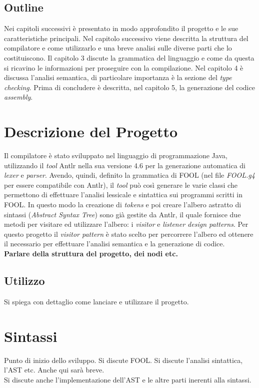 \documentclass{scrreprt}
\begin{document}
\section{Outline}
Nei capitoli successivi è presentato in modo approfondito il progetto e le sue caratteristiche principali. Nel capitolo successivo viene descritta la struttura del compilatore e come utilizzarlo e una breve analisi sulle diverse parti che lo costituiscono. Il capitolo 3 discute la grammatica del linguaggio e come da questa si ricavino le informazioni per proseguire con la compilazione. Nel capitolo 4 è discussa l'analisi semantica, di particolare importanza è la sezione del \textit{type checking}. Prima di concludere è descritta, nel capitolo 5, la generazione del codice \textit{assembly}.

\chapter{Descrizione del Progetto}
Il compilatore è stato sviluppato nel linguaggio di programmazione Java, utilizzando il \textit{tool} Antlr nella sua versione 4.6 per la generazione automatica di \textit{lexer} e \textit{parser}. Avendo, quindi, definito la grammatica di FOOL (nel file \textit{FOOL.g4} per essere compatibile con Antlr), il \textit{tool} può così generare le varie classi che permettono di effettuare l'analisi lessicale e sintattica sui programmi scritti in FOOL. In questo modo la creazione di \textit{tokens} e poi creare l'albero astratto di sintassi (\textit{Abstract Syntax Tree}) sono già gestite da Antlr, il quale fornisce due metodi per visitare ed utilizzare l'albero: i \textit{visitor} e \textit{listener design patterns}. Per questo progetto il \textit{visitor pattern} è stato scelto per percorrere l'albero ed ottenere il necessario per effettuare l'analisi semantica e la generazione di codice.\\

\textbf{Parlare della struttura del progetto, dei nodi etc.}

\section{Utilizzo}
Si spiega con dettaglio come lanciare e utilizzare il progetto.

\chapter{Sintassi}
Punto di inizio dello sviluppo. Si discute FOOL.
Si discute l'analisi sintattica, l'AST etc. Anche qui sarà breve.\\
Si discute anche l'implementazione dell'AST e le altre parti inerenti alla sintassi.
\end{document}
